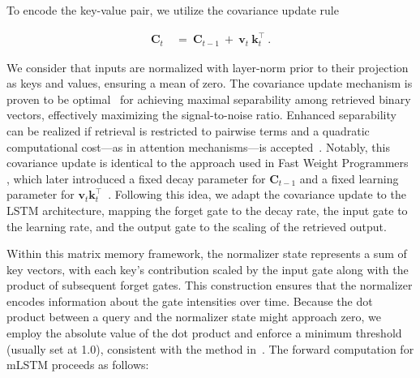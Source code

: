 To encode the key-value pair, we utilize the covariance update rule~\citep{Sejnowski:77,Dayan:91}

\begin{align}
\mathbf{C}_t \ &= \ \mathbf{C}_{t-1} \ + \ \mathbf{v}_{t} \ \mathbf{k}_t^\top \ .
\end{align}

We consider that inputs are normalized with layer-norm prior to their projection as keys and values, ensuring a mean of zero. The covariance update mechanism is proven to be optimal~\citep{Dayan:91} for achieving maximal separability among retrieved binary vectors, effectively maximizing the signal-to-noise ratio. Enhanced separability can be realized if retrieval is restricted to pairwise terms and a quadratic computational cost—as in attention mechanisms—is accepted~\citep{Krotov:16,Krotov:17,Ramsauer:21}. Notably, this covariance update is identical to the approach used in Fast Weight Programmers \citep{Schmidhuber:92ncfastweights,Schlag:21}, which later introduced a fixed decay parameter for $\mathbf{C}_{t-1}$ and a fixed learning parameter for $\mathbf{v}_{t} \mathbf{k}_t^\top$~\citep{Ba:16}. Following this idea, we adapt the covariance update to the LSTM architecture, mapping the forget gate to the decay rate, the input gate to the learning rate, and the output gate to the scaling of the retrieved output.

Within this matrix memory framework, the normalizer state represents a sum of key vectors, with each key's contribution scaled by the input gate along with the product of subsequent forget gates. This construction ensures that the normalizer encodes information about the gate intensities over time. Because the dot product between a query and the normalizer state might approach zero, we employ the absolute value of the dot product and enforce a minimum threshold (usually set at 1.0), consistent with the method in~\citep{Sun:23arxiv}. The forward computation for mLSTM proceeds as follows:

